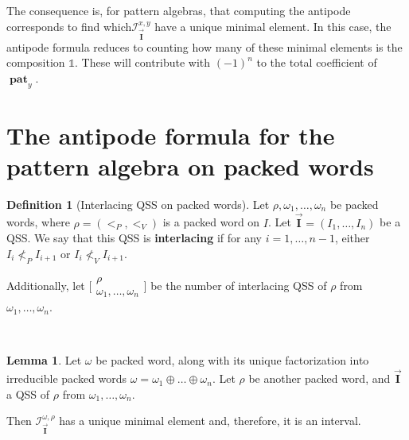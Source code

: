 \documentclass[12pt, reqno]{amsart}
\theoremstyle{definition}
\newtheorem{lm}[thm]{Lemma}
\newtheorem{defin}[thm]{Definition}
\newcommand{\III}{\vec{\mathbf{I}}}
\DeclareMathOperator{\pat}{\mathbf{pat}}
\begin{document}

The consequence is, for pattern algebras, that computing the antipode corresponds to find which$ \mathcal I_{\III}^{x, y}$ have a unique minimal element.
In this case, the antipode formula reduces to counting how many of these minimal elements is the composition $\mathbb{1}$.
These will contribute with $(-1)^n$ to the total coefficient of $\pat_y$.

\section{The antipode formula for the pattern algebra on packed words \label{sec:formula_packed}}

\begin{defin}[Interlacing QSS on packed words]
Let $\rho, \omega_1, \dots, \omega_n$ be packed words, where $\rho = (<_P, <_V)$ is a packed word on $I$.
Let $\III = (I_1, \dots, I_n)$ be a QSS.
We say that this QSS is \textbf{interlacing} if for any $i = 1, \dots, n-1$, either $I_i \not<_P I_{i+1}$ or $I_i \not<_V I_{i+1}$.

Additionally, let $ \bigl[\!\begin{smallmatrix} \rho  \\ \omega_1, \dots, \omega_n \end{smallmatrix}\!\bigr]$ be the number of interlacing QSS of $\rho$ from $\omega_1, \dots, \omega_n$.
\end{defin}

\

\begin{lm}\label{lm:minpacked}
Let $\omega$ be  packed word, along with its unique factorization into irreducible packed words $\omega = \omega_1 \oplus \dots \oplus \omega_n$.
Let $\rho$ be another packed word, and $\III$ a QSS of $\rho$ from $\omega_1, \dots , \omega_n$.

Then $\mathcal I^{\omega, \rho}_{\III}$ has a unique minimal element and, therefore, it is an interval.
\end{lm}
\end{document}
